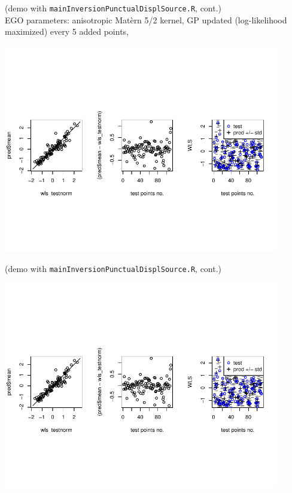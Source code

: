 \begin{frame}{}
{\tiny (demo with \texttt{mainInversionPunctualDisplSource.R}, cont.)}
\\
EGO parameters: anisotropic Mat\`ern 5/2 kernel, GP updated (log-likelihood maximized) every 5 added points,

\begin{center}
\includegraphics[width=0.9\textwidth]{4_optimization/figures/misfit_test_set_2} 
\end{center}
\end{frame}

\begin{frame}{}
\small (demo with \texttt{mainInversionPunctualDisplSource.R}, cont.)
\begin{center}
\includegraphics[width=0.9\textwidth]{4_optimization/figures/misfit_test_set_2} 
\end{center}
\end{frame}

